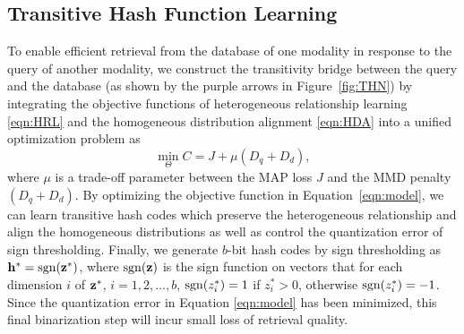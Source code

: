 \documentclass{article}
\begin{document}
\subsection{Transitive Hash Function Learning}
To enable efficient retrieval from the database of one modality in response to the query of another modality, we construct the transitivity bridge between the query and the database (as shown by the purple arrows in Figure~\ref{fig:THN}) by integrating the objective functions of heterogeneous relationship learning \eqref{eqn:HRL} and the homogeneous distribution alignment \eqref{eqn:HDA} into a unified optimization problem as\begin{equation}\label{eqn:model}
  \mathop {\min }\limits_\Theta  C = J + \mu \left( {{D_q} + {D_d}} \right),
\end{equation}
where $\mu$ is a trade-off parameter between the MAP loss $J$ and the MMD penalty $(D_q+D_d)$. By optimizing the objective function in Equation~\eqref{eqn:model}, we can learn transitive hash codes which preserve the heterogeneous relationship and align the homogeneous distributions as well as control the quantization error of sign thresholding. Finally, we generate $b$-bit hash codes by sign thresholding as ${\bf h}^\ast = {\mathop{\rm sgn}} (\bf{z}^\ast)$, where  ${\mathop{\rm sgn}} (\bf{z})$ is the sign function on vectors that for each dimension $i$ of $\bf{z}^\ast$, $i=1,2,...,b$, ${\mathop{\rm sgn}} (z_i^\ast)=1$ if $z_i^\ast > 0$, otherwise ${\mathop{\rm sgn}} (z_i^\ast)=-1$. Since the quantization error in Equation \eqref{eqn:model} has been minimized, this final binarization step will incur small loss of retrieval quality.
\end{document}
